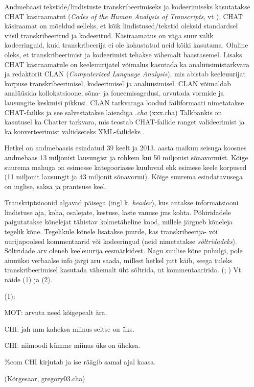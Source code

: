\documentclass[12pt]{article}
\begin{document}
Andmebaasi tekstide/lindistuste transkribeerimiseks ja kodeerimiseks kasutatakse CHAT käsiraamatut (\emph{Codes of the Human Analysis of Transcripts}, vt \citep{CHAT}). CHAT käsiraamat on mõeldud selleks, et kõik lindistused/tekstid oleksid standardsel viisil transkribeeritud ja kodeeritud. Käsiraamatus on väga suur valik kodeeringuid, kuid transkribeerija ei ole kohustatud neid kõiki kasutama. Oluline oleks, et transkribeerimist ja kodeerimist tehakse vähemalt baastasemel. Lisaks CHAT käsiraamatule on keeleuurijatel võimalus kasutada ka analüüsimistarkvara ja redaktorit CLAN (\emph{Computerized Language Analysis}), mis abistab keeleuurijat korpuse transkribeerimisel, kodeerimisel ja analüüsimisel. CLAN võimaldab analüüsida kollokatsioone, sõna- ja foneemisagedusi, arvutada vormide ja lausungite keskmisi pikkusi. CLAN tarkvaraga loodud failiformaati nimetatakse CHAT-failiks ja see salvestatakse laiendiga .\emph{cha} (xxx.cha) \citep[1--2, 6]{Gillis} Talkbankis on kasutusel ka Chatter tarkvara, mis teostab CHAT-failide ranget valideerimist ja ka konverteerimist valiidseteks XML-failideks \citep{CHATTER}.

Hetkel on andmebaasis esindatud 39 keelt ja 2013. aasta maikuu seisuga koosnes andmebaas 13 miljonist lausungist ja rohkem kui 50 miljonist sõnavormist. Kõige suurema mahuga on esimesse kategooriasse kuuluvad ehk esimese keele korpused (11 miljonit lausungit ja 43 miljonit sõnavormi). Kõige suurema esindatavusega on inglise, saksa ja prantsuse keel.\citep[2--5]{Gillis}

Transkriptsioonid algavad päisega (ingl k. \emph{header}), kus antakse informatsiooni lindistuse aja, koha, osalejate, kestuse, laste vanuse jms kohta. Põhiridadele paigutatakse kõnelejat tähistav kolmetäheline kood, millele järgneb  kõneleja tegelik kõne. Tegelikule kõnele lisatakse juurde, kas transkribeerija- või uurijapoolsed kommentaarid või kodeeringud (neid nimetatakse \emph{sõltridadeks}). Sõltridade arv oleneb keeleuurija eesmärkidest. Nagu suulise kõne puhulgi, pole ainuüksi verbaalse info järgi aru saada, millest hetkel jutt käib, seega tuleks transkribeerimisel kasutada vähemalt üht sõltrida, nt kommentaaririda. (\citealp[68]{Argus2007}; \citealp{CHAT}) Vt näide (1) ja (2).
\hfill

(1):
\begin{description}
    \item*MOT: arvuta need kõigepealt ära.
    \item*CHI: jah mm kaheksa miinus seitse on üks.
    \item*CHI: niimoodi kümme miinus üks on üheksa.
    \item\%com CHI kirjutab ja ise räägib samal ajal kaasa.
    \item(Kõrgesaar, gregory03.cha)
\end{description}
\hfill
\end{document}
